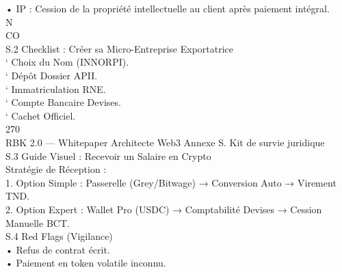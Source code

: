 • IP : Cession de la propriété intellectuelle au client après paiement intégral.\\
\vspace{0.5em}
\vspace{0.5em}
\vspace{0.5em}
N\\
CO\\
S.2 Checklist : Créer sa Micro-Entreprise Exportatrice\\
` Choix du Nom (INNORPI).\\
\vspace{0.5em}
` Dépôt Dossier APII.\\
\vspace{0.5em}
` Immatriculation RNE.\\
\vspace{0.5em}
` Compte Bancaire Devises.\\
\vspace{0.5em}
` Cachet Officiel.\\
\vspace{0.5em}
\vspace{0.5em}
\vspace{0.5em}
\vspace{0.5em}
270\\
RBK 2.0 — Whitepaper Architecte Web3                                                    Annexe S. Kit de survie juridique\\
\vspace{0.5em}
\vspace{0.5em}
\vspace{0.5em}
S.3 Guide Visuel : Recevoir un Salaire en Crypto\\
Stratégie de Réception :\\
\vspace{0.5em}
1. Option Simple : Passerelle (Grey/Bitwage) → Conversion Auto → Virement TND.\\
\vspace{0.5em}
2. Option Expert : Wallet Pro (USDC) → Comptabilité Devises → Cession Manuelle BCT.\\
\vspace{0.5em}
\vspace{0.5em}
\vspace{0.5em}
S.4 Red Flags (Vigilance)\\
• Refus de contrat écrit.\\
\vspace{0.5em}
• Paiement en token volatile inconnu.\\
\vspace{0.5em}
